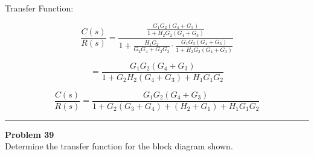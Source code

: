 \documentclass[11pt]{article}
\begin{document}
{Transfer Function:}

\[
\frac{C(s)}{R(s)} = 
\frac{
\frac{G_1G_2(G_4 + G_3)}{1 + H_2G_2(G_4 + G_3)}
}{
1 + \frac{H_1G_2}{G_2G_4 + G_2G_3} \cdot \frac{G_1G_2(G_4 + G_3)}{1 + H_2G_2(G_4 + G_3)}
}
\]

\vspace{1em}

\[
= \frac{G_1G_2(G_4 + G_3)}{1 + G_2H_2(G_4 + G_3) + H_1G_1G_2}
\]

\vspace{1em}

\[
\boxed{
\frac{C(s)}{R(s)} = \frac{G_1G_2(G_4 + G_3)}{1 + G_2(G_3 + G_4) + (H_2 + G_1) + H_1G_1G_2}
}
\]

\newpage
\noindent\rule{\textwidth}{1pt}
\noindent\textbf{Problem 39} \hfill 
\\ Determine the transfer function for the block diagram shown.
\end{document}
